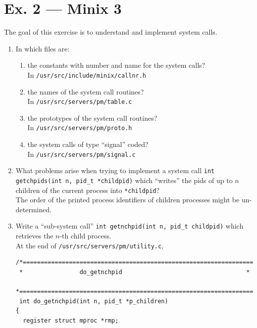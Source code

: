 \documentclass[a4paper]{article}
\begin{document}
\section*{Ex. 2 — Minix 3}
The goal of this exercise is to understand and implement system calls.
\begin{enumerate}
    \item In which files are:
    \begin{enumerate}
        \item the constants with number and name for the system calls?\\
        In \texttt{/usr/src/include/minix/callnr.h}
        \item the names of the system call routines?\\
        In \texttt{/usr/src/servers/pm/table.c}
        \item the prototypes of the system call routines?\\
        In \texttt{/usr/src/servers/pm/proto.h}
        \item the system calls of type “signal” coded?\\
        In \texttt{/usr/src/servers/pm/signal.c}
    \end{enumerate}
    \item What problems arise when trying to implement a system call \texttt{int getchpids(int n, pid\_t *childpid)} which “writes” the pids of up to $n$ children of the current process into \texttt{*childpid}?\\
    The order of the printed process identifiers of children processes might be un-determined.
    \item Write a “sub-system call” \texttt{int getnchpid(int n, pid\_t childpid)} which retrieves the $n$-th child process.\\
    At the end of \texttt{/usr/src/servers/pm/utility.c},
    \begin{verbatim}
/*===========================================================================*
 *			      do_getnchpid                                   *
 *===========================================================================*/
 int do_getnchpid(int n, pid_t *p_children)
{
  register struct mproc *rmp;
  

\end{verbatim}
\end{enumerate}
\end{document}
